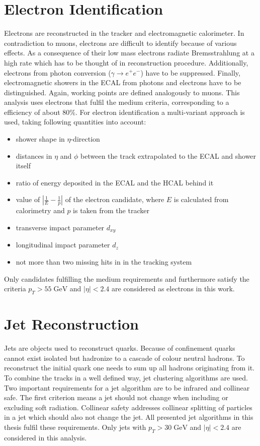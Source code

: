 \section{Electron Identification}
	Electrons are reconstructed in the tracker and electromagnetic calorimeter. In contradiction to muons, electrons are difficult to identify because of various effects. As a consequence of their low mass electrons radiate Bremsstrahlung at a high rate which has to be thought of in reconstruction procedure. Additionally, electrons from photon conversion ($\gamma \rightarrow e^+ e^-$) have to be suppressed. Finally, electromagnetic showers in the ECAL from photons and electrons have to be distinguished. Again, working points \cite{ElecID} are defined analogously to muons. This analysis uses electrons that fulfil the medium criteria, corresponding to a efficiency of about $80\%$. For electron identification a multi-variant approach is used, taking following quantities into account:
	\begin{itemize}
	\item shower shape in $\eta$-direction
	\item distances in $\eta$ and $\phi$ between the track extrapolated to the ECAL and shower itself
	\item ratio of energy deposited in the ECAL and the HCAL behind it
	\item value of $|\frac{1}{E} - \frac{1}{p}|$ of the electron candidate, where $E$ is calculated from calorimetry and $p$ is taken from the tracker
	\item transverse impact parameter $d_{xy}$
	\item longitudinal impact parameter $d_{z}$
	\item not more than two missing hits in in the tracking system
	\end{itemize}
	Only candidates fulfilling the medium requirements and furthermore satisfy the criteria $p_T > 55\;\text{GeV}$ and $|\eta| < 2.4$ are considered as electrons in this work.
\section{Jet Reconstruction}
	Jets are objects used to reconstruct quarks. Because of confinement quarks cannot exist isolated but hadronize to a cascade of colour neutral hadrons. To reconstruct the initial quark one needs to sum up all hadrons originating from it. To combine the tracks in a well defined way, jet clustering algorithms are used. Two important requirements for a jet algorithm are to be infrared and collinear safe. The first criterion means a jet should not change when including or excluding soft radiation. Collinear safety addresses collinear splitting of particles in a jet which should also not change the jet. All presented jet algorithms in this thesis fulfil these requirements. Only jets with $p_T > 30\;\text{GeV}$ and $|\eta| < 2.4$ are considered in this analysis.
	
